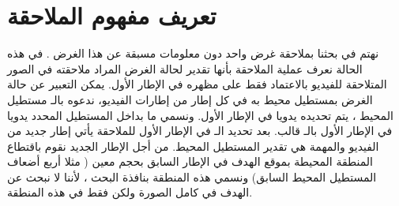 \section{تعريف مفهوم الملاحقة
}
نهتم في بحثنا بملاحقة غرض واحد
  دون معلومات مسبقة عن هذا الغرض 
.
  في هذه الحالة نعرف عملية الملاحقة بأنها تقدير لحالة الغرض المراد ملاحقته في الصور المتلاحقة للفيديو بالاعتماد فقط على مظهره في الإطار الأول. يمكن التعبير عن حالة الغرض بمستطيل محيط به في كل إطار من إطارات الفيديو، ندعوه بالـ مستطيل المحيط
،
يتم تحديده يدويا في الإطار الأول. ونسمي ما بداخل المستطيل المحدد يدويا في الإطار الأول بالـ
 قالب.
بعد تحديد الـ
 في الإطار الأول للملاحقة يأتي إطار جديد من الفيديو والمهمة هي تقدير المستطيل المحيط. من أجل الإطار الجديد نقوم باقتطاع المنطقة المحيطة بموقع الهدف في الإطار السابق بحجم معين ( مثلا أربع أضعاف المستطيل المحيط السابق) ونسمي هذه المنطقة بنافذة البحث 
،
لأننا لا نبحث عن الهدف في كامل الصورة ولكن فقط في هذه المنطقة.
%
